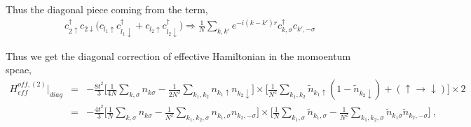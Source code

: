 \documentclass[reprint,prb,superscriptaddress]{revtex4-2}
\begin{document}
Thus the diagonal piece coming from the term,
\begin{eqnarray}
&& c_{2\uparrow}^{\dagger}c_{2\downarrow} \bigg(  c_{l_1\uparrow}c_{l_1\downarrow}^{\dagger} +  c_{l_2\uparrow}c_{l_2\downarrow}^{\dagger} \bigg)\Rightarrow \frac{1}{N} \displaystyle\sum_{k,k'} e^{-i(k-k')r} c_{k,\sigma}^{\dagger} c_{k',-\sigma}  \nonumber
\end{eqnarray}
\begin{widetext}
Thus we get the diagonal correction of effective Hamiltonian in the momoentum spcae,
\begin{eqnarray}
H_{eff}^{off,(2)} \bigg|_{diag} &=& -\frac{8t^2}{3} \bigg[ \frac{1}{4N} \displaystyle\sum_{k,\sigma} n_{k\sigma}-\frac{1}{2N^2} \displaystyle\sum_{k_1,k_2} n_{k_1\uparrow} n_{k_2\downarrow} \bigg] \times \bigg[\frac{1}{N^2} \displaystyle\sum_{k_1,k_2} \tilde{n}_{k_1\uparrow}(1-\tilde{n}_{k_2\downarrow}) + (\uparrow \rightarrow \downarrow)\bigg] \times 2 \nonumber\\
&=& -\frac{4t^2}{3} \bigg[ \frac{1}{N} \displaystyle\sum_{k,\sigma} n_{k\sigma}-\frac{1}{N^2} \displaystyle\sum_{k_1,k_2,\sigma} n_{k_1,\sigma} n_{k_2,-\sigma} \bigg] \times \bigg[\frac{1}{N} \displaystyle\sum_{k_1,\sigma} \tilde{n}_{k_1,\sigma} -  \frac{1}{N^2} \displaystyle\sum_{k_1,k_2,\sigma} \tilde{n}_{k_1\sigma}\tilde{n}_{k_2,-\sigma}\bigg]~,~~~~ 
\end{eqnarray}
%
%


\end{widetext}
\end{document}
